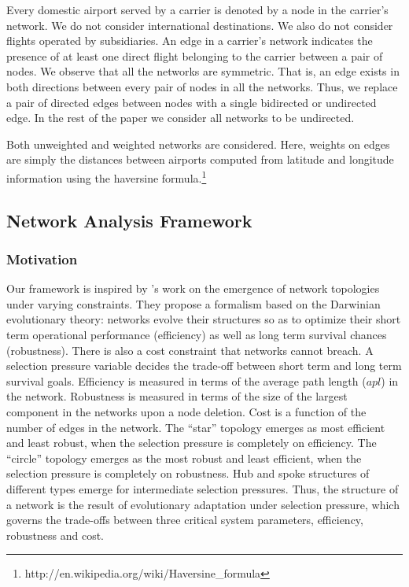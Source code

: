 \documentclass[10pt]{article}
\begin{document}
Every domestic airport served by a carrier is denoted by a node in the carrier's network. We do not consider international destinations. We also do not consider flights operated by subsidiaries. An edge in a carrier's network indicates the presence of at least one direct flight belonging to the carrier between a pair of nodes. We observe that all the networks are symmetric. That is, an edge exists in both directions between every pair of nodes in all the networks. Thus, we replace a pair of directed edges between nodes with a single bidirected or undirected edge. In the rest of the paper we consider all networks to be undirected.

Both unweighted and weighted networks are considered. Here, weights on edges are simply the distances between airports computed from latitude and longitude information using the haversine formula.\footnote{http://en.wikipedia.org/wiki/Haversine\_formula}

\subsection{Network Analysis Framework}\label{subsec:framework}

\subsubsection{Motivation}

Our framework is inspired by %
\cite{venkatasubramanian04}'s work on the emergence of network topologies under varying constraints. %
They propose a formalism based on the Darwinian evolutionary theory: networks evolve their structures so as to optimize their short term operational performance (efficiency) as well as long term survival chances (robustness). There is also a cost constraint that networks cannot breach. A selection pressure variable decides the trade-off between short term and long term survival goals. Efficiency is measured in terms of the average path length ($apl$) in the network. Robustness is measured in terms of the size of the largest component in the networks upon a node deletion. Cost is a function of the number of edges in the network. The ``star'' topology emerges as most efficient and least robust, when the selection pressure is completely on efficiency. The ``circle'' topology emerges as the most robust and least efficient, when the selection pressure is completely on robustness. Hub and spoke structures of different types emerge for intermediate selection pressures. Thus, %
the structure of a network is the result of evolutionary adaptation under selection pressure, which governs the trade-offs 
between three critical system parameters, efficiency, robustness and cost.%
\end{document}
